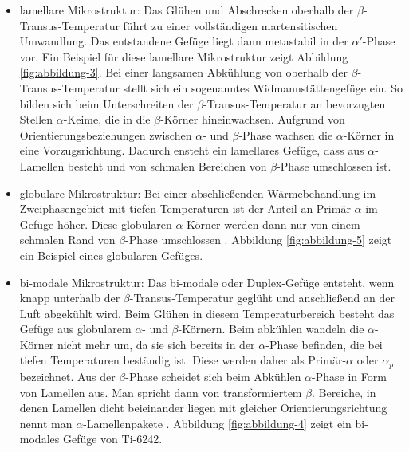 \begin{itemize} 
	\item lamellare Mikrostruktur: Das Glühen und Abschrecken oberhalb der $\beta$-Transus-Temperatur führt zu einer vollständigen martensitischen Umwandlung. Das entstandene Gefüge liegt dann metastabil in der $\alpha'$-Phase vor. Ein Beispiel für diese lamellare Mikrostruktur zeigt Abbildung \ref{fig:abbildung-3}. Bei einer langsamen Abkühlung von oberhalb der $\beta$-Transus-Temperatur stellt sich ein sogenanntes Widmannstättengefüge ein. So bilden sich beim Unterschreiten der $\beta$-Transus-Temperatur an bevorzugten Stellen $\alpha$-Keime, die in die $\beta$-Körner hineinwachsen. Aufgrund von Orientierungsbeziehungen zwischen $\alpha$- und $\beta$-Phase wachsen die $\alpha$-Körner in eine Vorzugsrichtung. Dadurch ensteht ein lamellares Gefüge, dass aus $\alpha$-Lamellen besteht und von schmalen Bereichen von $\beta$-Phase umschlossen ist.
	
\item globulare Mikrostruktur: Bei einer abschließenden Wärmebehandlung im Zweiphasengebiet mit tiefen Temperaturen ist der Anteil an Primär-$\alpha$ im Gefüge höher. Diese globularen $\alpha$-Körner werden dann nur von einem schmalen Rand von $\beta$-Phase umschlossen \cite{Lutjering.2007}. Abbildung \ref{fig:abbildung-5} zeigt ein Beispiel eines globularen Gefüges.

\item bi-modale Mikrostruktur: Das bi-modale oder Duplex-Gefüge entsteht, wenn knapp unterhalb der $\beta$-Transus-Temperatur geglüht und anschließend an der Luft abgekühlt wird. Beim Glühen in diesem Temperaturbereich besteht das Gefüge aus globularem $\alpha$- und $\beta$-Körnern. Beim abkühlen wandeln die $\alpha$-Körner nicht mehr um, da sie sich bereits in der $\alpha$-Phase befinden, die bei tiefen Temperaturen beständig ist. Diese werden daher als Primär-$\alpha$ oder $\alpha_p$ bezeichnet. Aus der $\beta$-Phase scheidet sich beim Abkühlen $\alpha$-Phase in Form von Lamellen aus. Man spricht dann von transformiertem $\beta$. Bereiche, in denen Lamellen dicht beieinander liegen mit gleicher Orientierungsrichtung nennt man $\alpha$-Lamellenpakete \cite{Lutjering.2007}. Abbildung \ref{fig:abbildung-4} zeigt ein bi-modales Gefüge von Ti-6242. 


\end{itemize}
